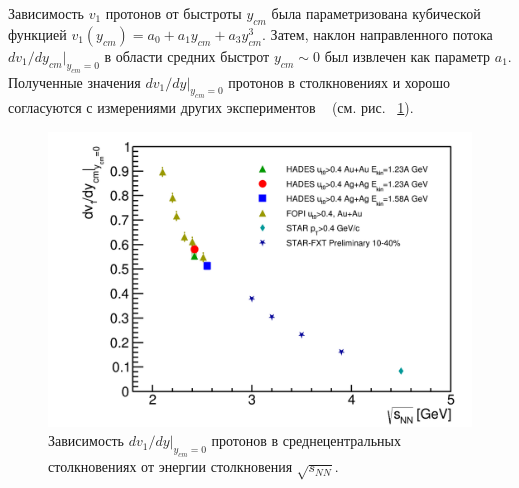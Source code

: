 Зависимость  $v_1$ протонов от  быстроты $y_{cm}$ была параметризована кубической функцией $v_1(y_{cm}) = a_0 + a_1 y_{cm} + a_3 y_{cm}^3$. 
Затем, наклон направленного потока  $dv_1/dy_{cm}|_{y_{cm}=0}$ в области средних быстрот $y_{cm}\sim0$ был извлечен как параметр $a_1$.
Полученные значения $dv_1/dy|_{y_{cm}=0}$ протонов в столкновениях \au{}  и \ag{} хорошо согласуются с измерениями  других экспериментов ~\cite{FOPI:2011aa,STAR:2020dav} (см. рис. ~\ref{fig:hades_dv1_dy_sqrt_snn}).
%
\begin{figure}[h]
\begin{center}
\includegraphics[width=0.47\linewidth]{images/dv1_dy_sqrt_snn.png}
\caption{ 
  Зависимость $dv_1/dy|_{y_{cm}=0}$ протонов в среднецентральных столкновениях от  энергии столкновения $\sqrt{s_{NN}}$.
}
\label{fig:hades_dv1_dy_sqrt_snn}
\end{center}
\end{figure}



